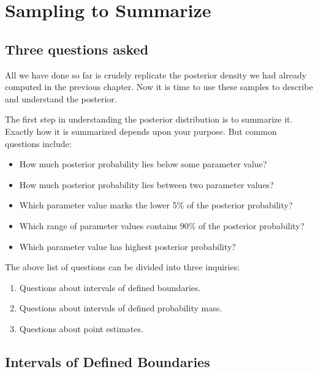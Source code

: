 \documentclass[
  letterpaper,
  DIV=11,
  numbers=noendperiod]{scrreprt}
\providecommand{\tightlist}{%
  \setlength{\itemsep}{0pt}\setlength{\parskip}{0pt}}\usepackage{longtable,booktabs,array}
\begin{document}
\hypertarget{sampling-to-summarize}{%
\section{Sampling to Summarize}\label{sampling-to-summarize}}

\hypertarget{three-questions-asked}{%
\subsection*{Three questions asked}\label{three-questions-asked}}

All we have done so far is crudely replicate the posterior density we
had already computed in the previous chapter. Now it is time to use
these samples to describe and understand the posterior.

The first step in understanding the posterior distribution is to
summarize it. Exactly how it is summarized depends upon your purpose.
But common questions include:

\begin{itemize}
\tightlist
\item
  How much posterior probability lies below some parameter value?
\item
  How much posterior probability lies between two parameter values?
\item
  Which parameter value marks the lower 5\% of the posterior
  probability?
\item
  Which range of parameter values contains 90\% of the posterior
  probability?
\item
  Which parameter value has highest posterior probability?
\end{itemize}

The above list of questions can be divided into three inquiries:

\begin{enumerate}
\def\labelenumi{\arabic{enumi}.}
\tightlist
\item
  Questions about intervals of defined boundaries.
\item
  Questions about intervals of defined probability mass.
\item
  Questions about point estimates.
\end{enumerate}

\hypertarget{intervals-of-defined-boundaries}{%
\subsection{Intervals of Defined
Boundaries}\label{intervals-of-defined-boundaries}}
\end{document}
